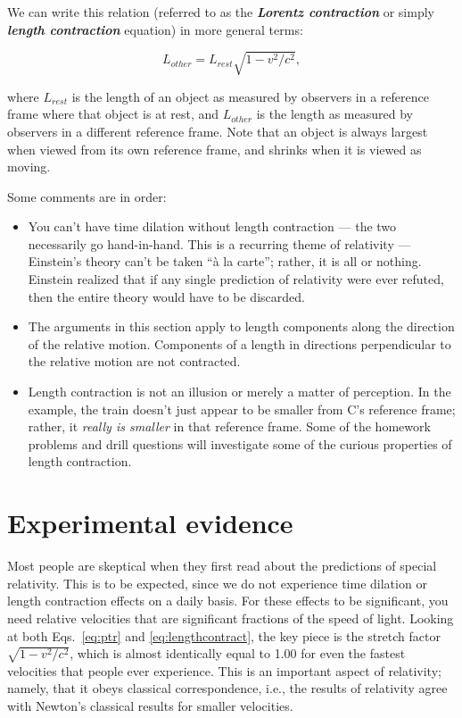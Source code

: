 We can write this relation (referred to as the \textbf{\emph{Lorentz
contraction}} or simply \textbf{\emph{length contraction}} equation) in
more general terms:

\begin{lemma}
\begin{equation}    
L_{ other} = L_{ rest}\sqrt{1-v^2/c^2},
\label{eq:lengthcontract}  
\end{equation}
\end{lemma}

 where $L_{ rest}$ is the length of an object as measured by
observers in a reference frame where that object is at rest, and
$L_{ other}$ is the length as measured by observers in a different
reference frame.  Note that an object is always largest when viewed
from its own reference frame, and shrinks when it is viewed as moving.
   
Some comments are in order:  
\begin{itemize}
\item You can't have time dilation without length contraction --- the 
two necessarily go hand-in-hand.  This is a recurring theme of relativity ---
Einstein's theory can't be taken ``\`a la carte''; rather, it is all or nothing.
Einstein realized that if any single prediction of relativity were
ever refuted, then the entire theory would have to be discarded.  
\item The arguments in this section apply to length components along
the direction of the relative motion.  Components of a length in 
directions perpendicular to the relative motion are not contracted. 
\item Length contraction is not an illusion or merely a matter of
perception.  In the example, the train doesn't just appear to be
smaller from C's reference frame; rather, it  \emph{really is
smaller} in that reference frame.  Some of the homework problems and
drill questions will investigate some of the curious properties of
length contraction.
\end{itemize}

\section{Experimental evidence}
   
Most people are skeptical when they first read about the predictions
of special relativity.  This is to be expected, since we do not
experience time dilation or length contraction effects on a daily
basis.  For these effects to be significant, you need relative
velocities that are significant fractions of the speed of light.
Looking at both Eqs.~\eqref{eq:ptr} and \eqref{eq:lengthcontract}, the
key piece is the stretch factor $\sqrt{1-v^2/c^2}$, which is almost
identically equal to 1.00 for even the fastest velocities that people
ever experience.  This is an important aspect of relativity;
namely, that it obeys classical correspondence, i.e., the results of
relativity agree with Newton's classical results for smaller
velocities.
   

